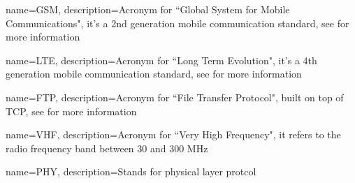 {
    name=GSM,
    description={Acronym for ``Global System for Mobile Communications", it's a 2nd generation mobile communication
    standard, see \cite{gsm_book} for more information}
}

{
    name=LTE,
    description={Acronym for ``Long Term Evolution", it's a 4th generation mobile communication standard, see \cite{lte_paper} for more information}
}

{
    name=FTP,
    description={Acronym for ``File Transfer Protocol", built on top of TCP, see \cite{ftp_rfc} for more information}
}

{
    name=VHF,
    description={Acronym for ``Very High Frequency", it refers to the radio frequency band between 30 and 300 MHz}
}

{
    name=PHY,
    description={Stands for physical layer protcol}
}

\makeglossaries
